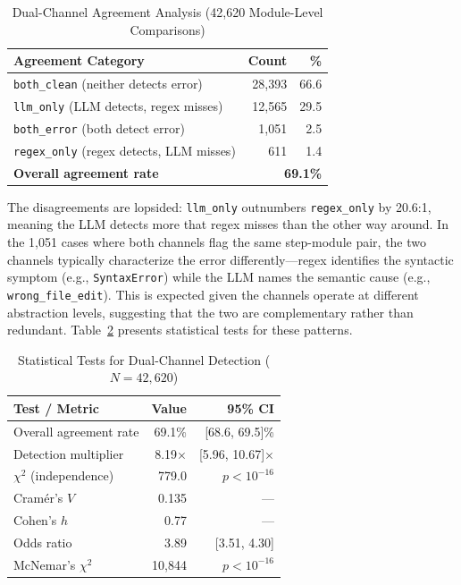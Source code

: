 \documentclass{ieeeaccess}
\begin{document}
\begin{table}[h!]
\caption{Dual-Channel Agreement Analysis (42,620 Module-Level Comparisons)}
\label{tab:agreement}
\centering
\setlength{\tabcolsep}{3pt}
\renewcommand{\arraystretch}{1.5}
\begin{tabularx}{\columnwidth}{|X|r|r|}
\hline
\textbf{Agreement Category} & \textbf{Count} & \textbf{\%} \\
\hline
\texttt{both\_clean} (neither detects error) & 28,393 & 66.6 \\
\hline
\texttt{llm\_only} (LLM detects, regex misses) & 12,565 & 29.5 \\
\hline
\texttt{both\_error} (both detect error)      & 1,051 &  2.5 \\
\hline
\texttt{regex\_only} (regex detects, LLM misses) & 611 &  1.4 \\
\hline
\hline
\textbf{Overall agreement rate}               & \multicolumn{2}{r|}{\textbf{69.1\%}} \\
\hline
\end{tabularx}
\end{table}

The disagreements are lopsided: \texttt{llm\_only} outnumbers \texttt{regex\_only} by 20.6:1, meaning the LLM detects more that regex misses than the other way around. In the 1,051 cases where both channels flag the same step-module pair, the two channels typically characterize the error differently---regex identifies the syntactic symptom (e.g., \texttt{SyntaxError}) while the LLM names the semantic cause (e.g., \texttt{wrong\_file\_edit}). This is expected given the channels operate at different abstraction levels, suggesting that the two are complementary rather than redundant. Table~\ref{tab:stats} presents statistical tests for these patterns.

\begin{table}[h!]
\caption{Statistical Tests for Dual-Channel Detection ($N = 42{,}620$)}
\label{tab:stats}
\centering
\setlength{\tabcolsep}{3pt}
\renewcommand{\arraystretch}{1.5}
\begin{tabularx}{\columnwidth}{|X|r|r|}
\hline
\textbf{Test / Metric} & \textbf{Value} & \textbf{95\% CI} \\
\hline
Overall agreement rate  & 69.1\% & [68.6, 69.5]\% \\
\hline
Detection multiplier    & 8.19$\times$ & [5.96, 10.67]$\times$ \\
\hline
$\chi^2$ (independence) & 779.0  & $p < 10^{-16}$ \\
\hline
Cram\'{e}r's $V$        & 0.135  & --- \\
\hline
Cohen's $h$             & 0.77   & --- \\
\hline
Odds ratio              & 3.89   & [3.51, 4.30] \\
\hline
McNemar's $\chi^2$      & 10{,}844 & $p < 10^{-16}$ \\
\hline
\end{tabularx}
\end{table}
\end{document}
